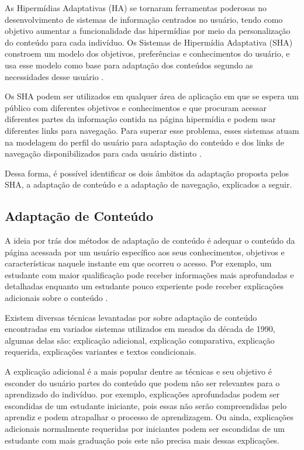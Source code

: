 As Hipermídias Adaptativas (HA) se tornaram ferramentas poderosas no desenvolvimento de sistemas de informação centrados no usuário, tendo como objetivo aumentar a funcionalidade das hipermídias por meio da personalização do conteúdo para cada indivíduo. Os Sistemas de Hipermídia Adaptativa (SHA) constroem um modelo dos objetivos, preferências e conhecimentos do usuário, e usa esse modelo como base para adaptação dos conteúdos segundo as necessidades desse usuário \cite{brusilovsky1996}.

Os SHA podem ser utilizados em qualquer área de aplicação em que se espera um público com diferentes objetivos e conhecimentos e que procuram acessar diferentes partes da informação contida na página hipermídia e podem usar diferentes links para navegação. Para superar esse problema, esses sistemas atuam na modelagem do perfil do usuário para adaptação do conteúdo e dos links de navegação disponibilizados para cada usuário distinto \cite{brusilovsky1996, brusilovsky2003, fragelli2010}.

Dessa forma, é possível identificar os dois âmbitos da adaptação proposta pelos SHA, a adaptação de conteúdo e a adaptação de navegação, explicados a seguir.

\subsection{Adaptação de Conteúdo}

A ideia por trás dos métodos de adaptação de conteúdo é adequar o conteúdo da página acessada por um usuário específico aos seus conhecimentos, objetivos e características naquele instante em que ocorreu o acesso.  Por exemplo, um estudante com maior qualificação pode receber informações mais aprofundadas e detalhadas enquanto um estudante pouco experiente pode receber explicações adicionais sobre o conteúdo \cite{brusilovsky1996}.

Existem diversas técnicas levantadas por \cite{brusilovsky1996} sobre adaptação de conteúdo encontradas em variados sistemas utilizados em meados da década de 1990, algumas delas são: explicação adicional, explicação comparativa, explicação requerida, explicações variantes e textos condicionais.

A explicação adicional é a mais popular dentre as técnicas e seu objetivo é esconder do usuário partes do conteúdo que podem não ser relevantes para o aprendizado do indivíduo. por exemplo, explicações aprofundadas podem ser escondidas de um estudante iniciante, pois essas não serão compreendidas pelo aprendiz e podem atrapalhar o processo de aprendizagem. Ou ainda, explicações adicionais normalmente requeridas por iniciantes podem ser escondidas de um estudante com mais graduação pois este não precisa mais dessas explicações.

